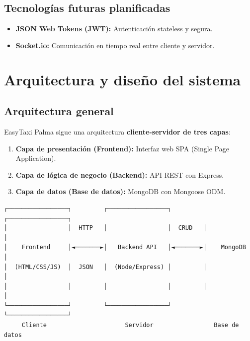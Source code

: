 \documentclass[12pt,a4paper]{article}
\begin{document}
\subsection{Tecnologías futuras planificadas}

\begin{itemize}
    \item \textbf{JSON Web Tokens (JWT):} Autenticación stateless y segura.
    \item \textbf{Socket.io:} Comunicación en tiempo real entre cliente y servidor.
\end{itemize}

\newpage

\section{Arquitectura y diseño del sistema}

\subsection{Arquitectura general}

EasyTaxi Palma sigue una arquitectura \textbf{cliente-servidor de tres capas}:

\begin{enumerate}
    \item \textbf{Capa de presentación (Frontend):} Interfaz web SPA (Single Page Application).
    \item \textbf{Capa de lógica de negocio (Backend):} API REST con Express.
    \item \textbf{Capa de datos (Base de datos):} MongoDB con Mongoose ODM.
\end{enumerate}

\begin{verbatim}
┌─────────────────┐         ┌─────────────────┐         ┌─────────────────┐
│                 │  HTTP   │                 │  CRUD   │                 │
│    Frontend     │◄───────►│   Backend API   │◄───────►│    MongoDB      │
│  (HTML/CSS/JS)  │  JSON   │  (Node/Express) │         │                 │
│                 │         │                 │         │                 │
└─────────────────┘         └─────────────────┘         └─────────────────┘
     Cliente                      Servidor                 Base de datos
\end{verbatim}
\end{document}
